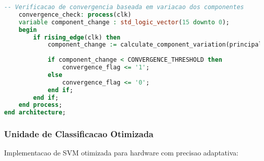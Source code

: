 \begin{lstlisting}[language=VHDL]
    -- Verificacao de convergencia baseada em variacao dos componentes
    convergence_check: process(clk)
    variable component_change : std_logic_vector(15 downto 0);
    begin
        if rising_edge(clk) then
            component_change := calculate_component_variation(principal_components);
            
            if component_change < CONVERGENCE_THRESHOLD then
                convergence_flag <= '1';
            else
                convergence_flag <= '0';
            end if;
        end if;
    end process;
end architecture;
\end{lstlisting}

\subsubsection{Unidade de Classificacao Otimizada}
Implementacao de SVM otimizada para hardware com precisao adaptativa:

